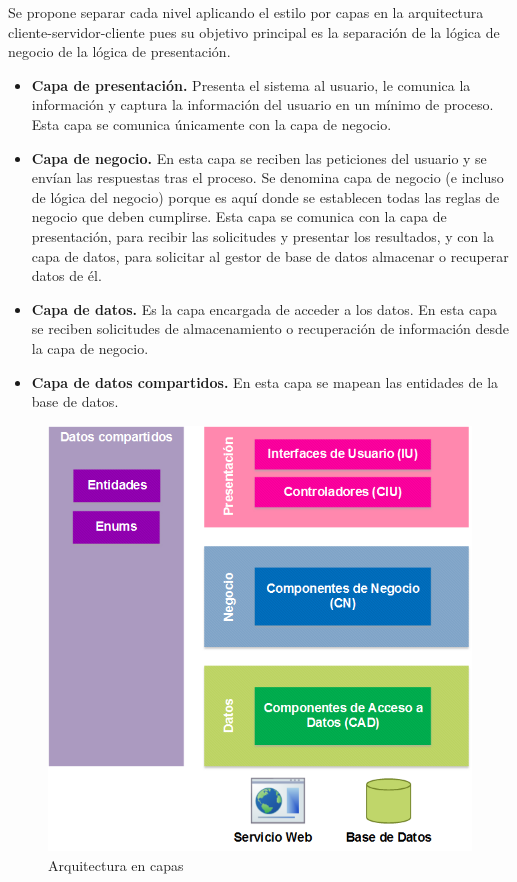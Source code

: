 Se propone separar cada nivel aplicando el estilo por capas en la arquitectura cliente-servidor-cliente pues su objetivo principal es la separación de la lógica de negocio de la lógica de presentación.\\

\begin{itemize}
	\item \textbf{Capa de presentación.} Presenta el sistema al usuario, le comunica la información y captura la información del usuario en un mínimo de proceso. Esta capa se comunica únicamente con la capa de negocio.
	\item \textbf{Capa de negocio.} En esta capa se reciben las peticiones del usuario y se envían las respuestas tras el proceso. Se denomina capa de negocio (e incluso de lógica del negocio) porque es aquí donde se establecen todas las reglas de negocio que deben cumplirse. Esta capa se comunica con la capa de presentación, para recibir las solicitudes y presentar los resultados, y con la capa de datos, para solicitar al gestor de base de datos almacenar o recuperar datos de él.
	\item \textbf{Capa de datos.} Es la capa encargada de acceder a los datos. En esta capa se reciben solicitudes de almacenamiento o recuperación de información desde la capa de negocio.
	\item \textbf{Capa de datos compartidos.} En esta capa se mapean las entidades de la base de datos.
\end{itemize}

\begin{figure}[H]
	\begin{center}
		\includegraphics[scale=0.5]{./Figuras/Arquitectura/Arquitectura_enCapas}
	\end{center}
	\caption{Arquitectura en capas}
	\label{fig:Arquitectura_enCapas}
\end{figure}

